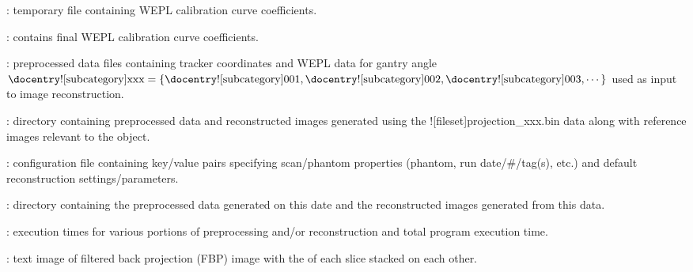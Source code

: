 \begin{tcbenvironment}
\begin{tcbparagraph}
\begin{ThinEnum}
\begin{ThinEnum}
\begin{ThinEnum}
\begin{ThinEnum}
\begin{ThinEnum}
\begin{ThinEnum}
\begin{ThinEnum}
						\item {} : temporary file containing WEPL calibration curve coefficients.
                                	\item {} : contains final WEPL calibration curve coefficients.
\newpage
                                	\item {} : preprocessed data files containing tracker coordinates and WEPL data for gantry angle $\text{\docentry![subcategory]{xxx}} =\{\text{\docentry![subcategory]{001}}, \text{\docentry![subcategory]{002}}, \text{\docentry![subcategory]{003}}, \cdots\}$ used as input to image reconstruction.
						\item {} : directory containing preprocessed data and reconstructed images generated using the \docentry![fileset]{projection\_xxx.bin} data along with reference images relevant to the object.
                                	\begin{ThinEnum}
                                    	\item {} : configuration file containing key/value pairs specifying scan/phantom properties
                                    (phantom, run date/\#/tag(s), etc.) and default reconstruction settings/parameters.
                    				\item {} : directory containing the preprocessed data generated on this date and the reconstructed images generated from this data.
                                    \begin{ThinEnum}
                                        	\item {} : execution times for various portions of preprocessing and/or reconstruction and total program execution time.
                                        	\item {} : text image of filtered back projection (FBP) image with the \xyplane* of each slice stacked on each other.

\end{ThinEnum}
\end{ThinEnum}
\end{ThinEnum}
\end{ThinEnum}
\end{ThinEnum}
\end{ThinEnum}
\end{ThinEnum}
\end{ThinEnum}
\end{ThinEnum}
\end{tcbparagraph}
\end{tcbenvironment}
